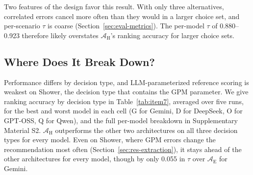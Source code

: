 \documentclass[final,3p,times]{elsarticle}
\begin{document}
Two features of the design favor this result. With only three alternatives, correlated errors cancel more often than they would in a larger choice set, and per-scenario $\tau$ is coarse (Section~\ref{sec:eval-metrics}). The per-model $\tau$ of 0.880--0.923 therefore likely overstates $\mathcal{A}_{\text{H}}$'s ranking accuracy for larger choice sets.

\FloatBarrier
\subsection{Where Does It Break Down?}
\label{sec:res-bytype}
Performance differs by decision type, and LLM-parameterized reference scoring is weakest on Shower, the decision type that contains the GPM parameter. We give ranking accuracy by decision type in Table~\ref{tab:item7}, averaged over five runs, for the best and worst model in each cell (G for Gemini, D for DeepSeek, O for GPT-OSS, Q for Qwen), and the full per-model breakdown in Supplementary Material S2. $\mathcal{A}_{\text{H}}$ outperforms the other two architectures on all three decision types for every model. Even on Shower, where GPM errors change the recommendation most often (Section~\ref{sec:res-extraction}), it stays ahead of the other architectures for every model, though by only 0.055 in $\tau$ over $\mathcal{A}_{\text{E}}$ for Gemini.
\end{document}
